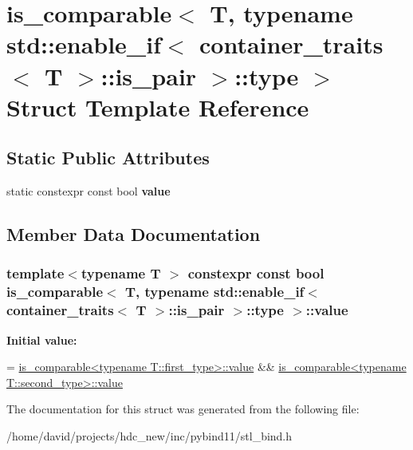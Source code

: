 \hypertarget{structis__comparable_3_01_t_00_01typename_01std_1_1enable__if_3_01container__traits_3_01_t_01_4_1_1is__pair_01_4_1_1type_01_4}{}\section{is\+\_\+comparable$<$ T, typename std\+:\+:enable\+\_\+if$<$ container\+\_\+traits$<$ T $>$\+:\+:is\+\_\+pair $>$\+:\+:type $>$ Struct Template Reference}
\label{structis__comparable_3_01_t_00_01typename_01std_1_1enable__if_3_01container__traits_3_01_t_01_4_1_1is__pair_01_4_1_1type_01_4}
\subsection*{Static Public Attributes}
\begin{DoxyCompactItemize}
\item 
static constexpr const bool {\bfseries value}
\end{DoxyCompactItemize}


\subsection{Member Data Documentation}
\subsubsection[{\texorpdfstring{value}{value}}]{\setlength{\rightskip}{0pt plus 5cm}template$<$typename T $>$ constexpr const bool {\bf is\+\_\+comparable}$<$ T, typename std\+::enable\+\_\+if$<$ {\bf container\+\_\+traits}$<$ T $>$\+::is\+\_\+pair $>$\+::type $>$\+::value\hspace{0.3cm}{\ttfamily [static]}}\hypertarget{structis__comparable_3_01_t_00_01typename_01std_1_1enable__if_3_01container__traits_3_01_t_01_4_1_1is__pair_01_4_1_1type_01_4_ac9cf0c8206e4aa63dac790aae391314a}{}\label{structis__comparable_3_01_t_00_01typename_01std_1_1enable__if_3_01container__traits_3_01_t_01_4_1_1is__pair_01_4_1_1type_01_4_ac9cf0c8206e4aa63dac790aae391314a}
{\bfseries Initial value\+:}
\begin{DoxyCode}
=
        \hyperlink{structis__comparable}{is\_comparable<typename T::first\_type>::value} &&
        \hyperlink{structis__comparable}{is\_comparable<typename T::second\_type>::value}
\end{DoxyCode}


The documentation for this struct was generated from the following file\+:\begin{DoxyCompactItemize}
\item 
/home/david/projects/hdc\+\_\+new/inc/pybind11/stl\+\_\+bind.\+h\end{DoxyCompactItemize}
